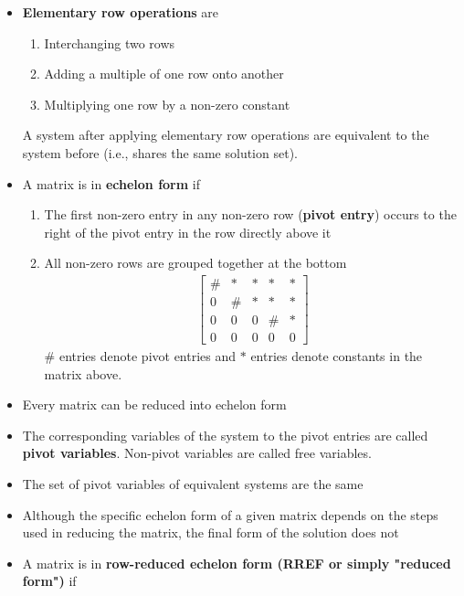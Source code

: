 \begin{itemize}
  \item \textbf{Elementary row operations} are
    \begin{enumerate}[label={(\roman*)}]
      \item Interchanging two rows
      \item Adding a multiple of one row onto another
      \item Multiplying one row by a non-zero constant
    \end{enumerate}
    A system after applying elementary row operations are equivalent to the system before (i.e., shares the same solution set).
  \item A matrix is in \textbf{echelon form} if
    \begin{enumerate}[label={\alph*)}]
      \item The first non-zero entry in any non-zero row (\textbf{pivot entry}) occurs to the right of the pivot entry in the row directly above it
      \item All non-zero rows are grouped together at the bottom
        \begin{align*}
          \begin{bmatrix}
            \# & * & * & * & * \\
            0 & \# & * & * & * \\
            0 & 0 & 0 & \# & * \\
            0 & 0 & 0 & 0 & 0
          \end{bmatrix}
        \end{align*}
        $\#$ entries denote pivot entries and $*$ entries denote constants in the matrix above.
    \end{enumerate}
    \item Every matrix can be reduced into echelon form
    \item The corresponding variables of the system to the pivot entries are called \textbf{pivot variables}.
      Non-pivot variables are called free variables.
    \item The set of pivot variables of equivalent systems are the same
    \item Although the specific echelon form of a given matrix depends on the steps used in reducing the matrix, the final form of the solution does not
    \item A matrix is in \textbf{row-reduced echelon form (RREF or simply "reduced form")} if
      \begin{enumerate}[label={\alph*)}]

\end{enumerate}
\end{itemize}
